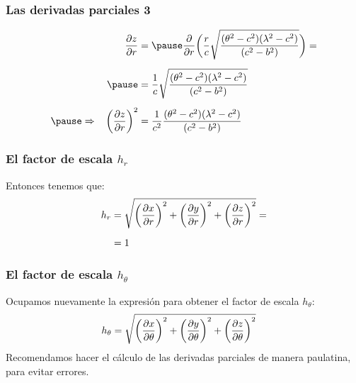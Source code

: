 \documentclass[12pt]{beamer}
\begin{document}
\begin{frame}
\frametitle{Las derivadas parciales 3}
\begin{eqnarray*}
\begin{aligned}
\pdv{z}{r} &= \pause \pdv{r} \bigg( \dfrac{r}{c} \sqrt{\dfrac{ (\theta^{2} - c^{2}) (\lambda^{2} - c^{2}) }{(c^{2} - b^{2})}} \bigg) = \\[0.5em] \pause
&= \dfrac{1}{c} \sqrt{\dfrac{ (\theta^{2} - c^{2}) (\lambda^{2} - c^{2}) }{(c^{2} - b^{2})}} \\[0.5em] \pause
\Rightarrow \hspace{0.3cm} \bigg( \pdv{z}{r} \bigg)^{2} &= \dfrac{1}{c^{2}} \dfrac{ (\theta^{2} - c^{2}) (\lambda^{2} - c^{2}) }{(c^{2} - b^{2})}
\end{aligned}
\end{eqnarray*}
\end{frame}
\begin{frame}
\frametitle{El factor de escala $h_{r}$}
Entonces tenemos que:
\pause
\begin{align*}
h_{r} &= \sqrt{\bigg( \pdv{x}{r} \bigg)^{2} + \bigg( \pdv{y}{r} \bigg)^{2} + \bigg( \pdv{z}{r} \bigg)^{2}} = \\[0.5em]
&= 1
\end{align*}
\end{frame}
\begin{frame}
\frametitle{El factor de escala $h_{\theta}$}
Ocupamos nuevamente la expresión para obtener el factor de escala $h_{\theta}$:
\pause
\begin{align*}
h_{\theta} &= \sqrt{\bigg( \pdv{x}{\theta} \bigg)^{2} + \bigg( \pdv{y}{\theta} \bigg)^{2} + \bigg( \pdv{z}{\theta} \bigg)^{2}}
\end{align*}
Recomendamos hacer el cálculo de las derivadas parciales de manera paulatina, para evitar errores.
\end{frame}
\end{document}

